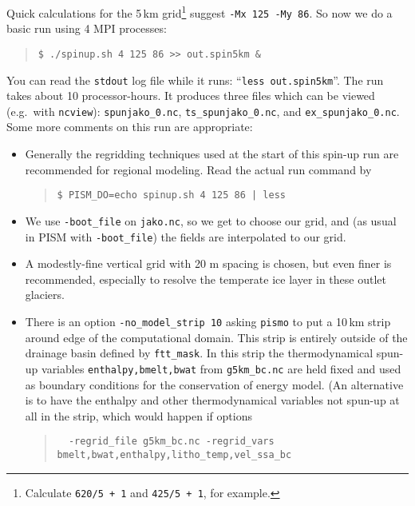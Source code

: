 Quick calculations for the 5\,km grid\footnote{Calculate \texttt{620/5 + 1} and \texttt{425/5 + 1}, for example.} suggest \verb|-Mx 125 -My 86|.  So now we do a basic run using 4 MPI processes:
\begin{quote}\small
\begin{verbatim}
$ ./spinup.sh 4 125 86 >> out.spin5km &
\end{verbatim}
\normalsize\end{quote}
You can read the \texttt{stdout} log file while it runs: ``\verb|less out.spin5km|''.  The run takes about 10 processor-hours.   %
It produces three files which can be viewed (e.g.~with \verb|ncview|): \verb|spunjako_0.nc|, \verb|ts_spunjako_0.nc|, and \verb|ex_spunjako_0.nc|.  Some more comments on this run are appropriate:
\begin{itemize}
\item Generally the regridding techniques used at the start of this spin-up run are recommended for regional modeling.  Read the actual run command by
\begin{quote}\small
\begin{verbatim}
$ PISM_DO=echo spinup.sh 4 125 86 | less
\end{verbatim}
\normalsize\end{quote}
\item  We use \verb|-boot_file| on \verb|jako.nc|, so we get to choose our grid, and (as usual in PISM with \verb|-boot_file|) the fields are interpolated to our grid.
\item A modestly-fine vertical grid with 20 m spacing is chosen, but even finer is recommended, especially to resolve the temperate ice layer in these outlet glaciers.
\item There is an option \verb|-no_model_strip 10| asking \verb|pismo| to put a 10\,km strip around edge of the computational domain.  This strip is entirely outside of the drainage basin defined by \verb|ftt_mask|.  In this strip the thermodynamical spun-up variables \verb|enthalpy,bmelt,bwat| from \verb|g5km_bc.nc| are held fixed and used as boundary conditions for the conservation of energy model. (An alternative is to have the enthalpy and other thermodynamical variables not spun-up at all in the strip, which would happen if options 
\begin{quote}\small
\begin{verbatim}
  -regrid_file g5km_bc.nc -regrid_vars bmelt,bwat,enthalpy,litho_temp,vel_ssa_bc
\end{verbatim}

\end{quote}
\end{itemize}
